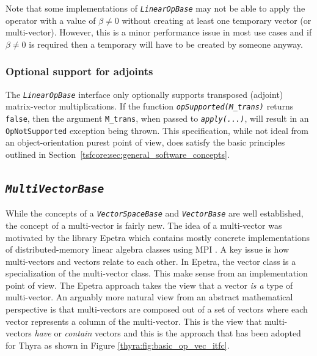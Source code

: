 \documentclass[pdf,ps2pdf,11pt]{SANDreport}
\begin{document}
Note that some implementations of {}\texttt{\textit{Linear\-Op\-Base}} may not
be able to apply the operator with a value of $\beta {}\ne 0$ without
creating at least one temporary vector (or multi-vector).  However,
this is a minor performance issue in most use cases and if $\beta
{}\ne 0$ is required then a temporary will have to be created by
someone anyway.

%
\subsubsection{Optional support for adjoints}
\label{tsfcore:sec:linear_op_adjoints}
%

The {}\texttt{\textit{Linear\-Op\-Base}} interface only optionally supports
transposed (adjoint) matrix-vector multiplications.  If the function
{}\texttt{\textit{opSupported(M\_trans)}} returns {}\texttt{false}, then the
argument {}\texttt{M\_trans}, when passed to {}\texttt{\textit{apply(\-...)}},
will result in an {}\texttt{OpNotSupported} exception being thrown.  This
specification, while not ideal from an object-orientation purest point of
view, does satisfy the basic principles outlined in
Section~\ref{tsfcore:sec:general_software_concepts}.

%
\subsection{\texttt{\textit{Multi\-Vector\-Base}}}
\label{tsfcore:sec:multi_vec}
%

While the concepts of a {}\texttt{\textit{Vector\-Space\-Base}} and
{}\texttt{\textit{Vector\-Base}} are well established, the concept of a
multi-vector is fairly new.  The idea of a multi-vector was motivated
by the library Epetra {}\cite{ref:Epetra} which contains mostly
concrete implementations of distributed-memory linear algebra classes
using MPI {}\cite{ref:mpi}.  A key issue is how multi-vectors and
vectors relate to each other.  In Epetra, the vector class is a
specialization of the multi-vector class.  This make sense from an
implementation point of view.  The Epetra approach takes the view that
a vector {\em is a} type of multi-vector.  An arguably more natural
view from an abstract mathematical perspective is that multi-vectors
are composed out of a set of vectors where each vector represents a
column of the multi-vector.  This is the view that multi-vectors {\em
have} or {\em contain} vectors and this is the approach that has been
adopted for Thyra as shown in Figure {}\ref{thyra:fig:basic_op_vec_itfc}.
\end{document}
